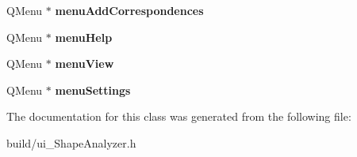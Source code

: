 \begin{DoxyCompactItemize}
\item 
\hypertarget{class_ui___shape_analyzer_a8fbca80870577faea6ae5743dbf59e23}{}Q\+Menu $\ast$ {\bfseries menu\+Add\+Correspondences}\label{class_ui___shape_analyzer_a8fbca80870577faea6ae5743dbf59e23}

\item 
\hypertarget{class_ui___shape_analyzer_acc4b28984833fe6b3af1ad8d40930879}{}Q\+Menu $\ast$ {\bfseries menu\+Help}\label{class_ui___shape_analyzer_acc4b28984833fe6b3af1ad8d40930879}

\item 
\hypertarget{class_ui___shape_analyzer_a6d76539bf4f5b4e42d819d7849b6cd68}{}Q\+Menu $\ast$ {\bfseries menu\+View}\label{class_ui___shape_analyzer_a6d76539bf4f5b4e42d819d7849b6cd68}

\item 
\hypertarget{class_ui___shape_analyzer_a078ad21656e7c80da199243bab32eef1}{}Q\+Menu $\ast$ {\bfseries menu\+Settings}\label{class_ui___shape_analyzer_a078ad21656e7c80da199243bab32eef1}

\end{DoxyCompactItemize}


The documentation for this class was generated from the following file\+:\begin{DoxyCompactItemize}
\item 
build/ui\+\_\+\+Shape\+Analyzer.\+h\end{DoxyCompactItemize}
